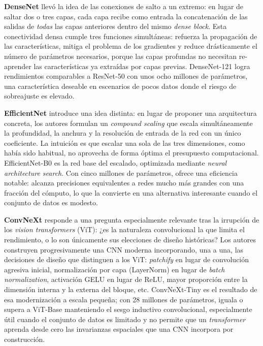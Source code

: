 \documentclass[12pt]{extarticle}
\numberwithin{equation}{section}
\begin{document}
\begin{refsection}
\textbf{DenseNet} \cite{huang2017densely} llevó la idea de las conexiones de salto a un extremo: en lugar de saltar dos o tres capas, cada capa recibe como entrada la concatenación de las salidas de \textit{todas} las capas anteriores dentro del mismo \textit{dense block}. Esta conectividad densa cumple tres funciones simultáneas: refuerza la propagación de las características, mitiga el problema de los gradientes y reduce drásticamente el número de parámetros necesarios, porque las capas profundas no necesitan re-aprender las características ya extraídas por capas previas. DenseNet-121 logra rendimientos comparables a ResNet-50 con unos ocho millones de parámetros, una característica deseable en escenarios de pocos datos donde el riesgo de sobreajuste es elevado.

\textbf{EfficientNet} \cite{tan2019efficientnet} introduce una idea distinta: en lugar de proponer una arquitectura concreta, los autores formulan un \textit{compound scaling} que escala simultáneamente la profundidad, la anchura y la resolución de entrada de la red con un único coeficiente. La intuición es que escalar una sola de las tres dimensiones, como había sido habitual, no aprovecha de forma óptima el presupuesto computacional. EfficientNet-B0 es la red base del escalado, optimizada mediante \textit{neural architecture search}. Con cinco millones de parámetros, ofrece una eficiencia notable: alcanza precisiones equivalentes a redes mucho más grandes con una fracción del cómputo, lo que la convierte en una alternativa interesante cuando el conjunto de datos es modesto.

\textbf{ConvNeXt} \cite{liu2022convnet} responde a una pregunta especialmente relevante tras la irrupción de los \textit{vision transformers} (ViT): ¿es la naturaleza convolucional la que limita el rendimiento, o lo son únicamente sus elecciones de diseño históricas? Los autores construyen progresivamente una CNN moderna incorporando, una a una, las decisiones de diseño que distinguen a los ViT: \textit{patchify} en lugar de convolución agresiva inicial, normalización por capa (LayerNorm) en lugar de \textit{batch normalization}, activación GELU en lugar de ReLU, mayor proporción entre la dimensión interna y la externa del bloque, etc. ConvNeXt-Tiny es el resultado de esa modernización a escala pequeña; con 28 millones de parámetros, iguala o supera a ViT-Base manteniendo el sesgo inductivo convolucional, especialmente útil cuando el conjunto de datos es limitado y no permite que un \textit{transformer} aprenda desde cero las invarianzas espaciales que una CNN incorpora por construcción.


\end{refsection}
\end{document}
